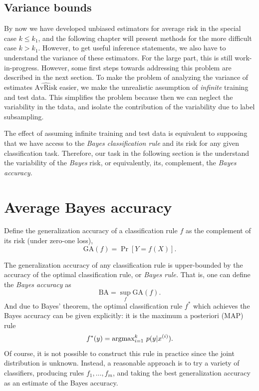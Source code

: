 \subsection{Variance bounds}

By now we have developed unbiased estimators for average risk in the
special case $k \leq k_1$, and the following chapter will present
methods for the more difficult case $k > k_1$.  However, to get useful
inference statements, we also have to understand the variance of these
estimators.  For the large part, this is still work-in-progress.
However, some first steps towards addressing this problem are
described in the next section.  To make the problem of analyzing the
variance of estimates $\hat{\text{AvRisk}}$ easier, we make the
unrealistic assumption of \emph{infinite} training and test data.
This simplifies the problem because then we can neglect the
variability in the tdata, and isolate the contribution of the
variability due to label subsampling.

The effect of assuming infinite training and test data is equivalent
to supposing that we have access to the \emph{Bayes classification
  rule} and its risk for any given classification task.  Therefore,
our task in the following section is the understand the variability of
the \emph{Bayes} risk, or equivalently, its, complement, the
\emph{Bayes accuracy.}

\section{Average Bayes accuracy}


Define the generalization accuracy of a classification rule $f$ as the complement
of its risk (under zero-one loss),
\[
\text{GA}(f) = \Pr[Y = f(X)].
\]

The generalization accuracy of any classification rule is
upper-bounded by the accuracy of the optimal classification rule, or
\emph{Bayes rule.}  That is, one can define the \emph{Bayes accuracy}
as
\[
\text{BA} = \sup_f \text{GA}(f).
\]
And due to Bayes' theorem, the optimal classification rule $f^*$ which
achieves the Bayes accuracy can be given explicitly: it is the maximum a
posteriori (MAP) rule
\[
f^*(y) = \text{argmax}_{i=1}^k\ p(y|x^{(i)}).
\]
Of course, it is not possible to construct this rule in practice since
the joint distribution is unknown.  Instead, a reasonable approach is
to try a variety of classifiers, producing rules $f_1,\hdots, f_m$,
and taking the best generalization accuracy as an estimate of the Bayes
accuracy. 


